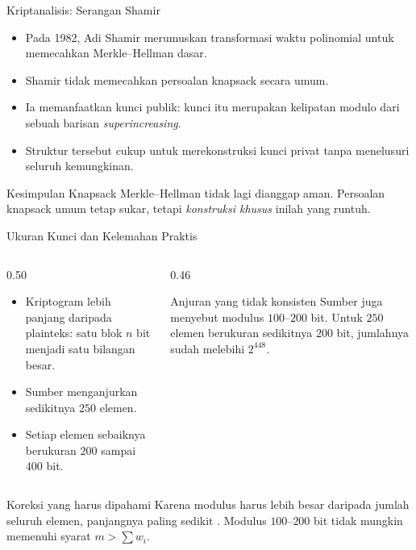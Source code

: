 \documentclass[aspectratio=169,11pt]{beamer}
\begin{document}
\begin{frame}{Kriptanalisis: Serangan Shamir}
    \begin{itemize}
        \item Pada 1982, Adi Shamir merumuskan transformasi waktu polinomial
              untuk memecahkan Merkle--Hellman dasar.
        \item Shamir tidak memecahkan persoalan knapsack secara umum.
        \item Ia memanfaatkan  kunci publik: kunci itu
              merupakan kelipatan modulo dari sebuah barisan
              \textit{superincreasing}.
        \item Struktur tersebut cukup untuk merekonstruksi kunci privat tanpa
              menelusuri seluruh kemungkinan.
    \end{itemize}
    \vspace{0.2cm}
    \begin{alertblock}{Kesimpulan}
        \footnotesize
        Knapsack Merkle--Hellman tidak lagi dianggap aman. Persoalan knapsack
        umum tetap sukar, tetapi \emph{konstruksi khusus} inilah yang runtuh.
    \end{alertblock}
\end{frame}

\begin{frame}{Ukuran Kunci dan Kelemahan Praktis}
    \begin{columns}[T,onlytextwidth]
        \begin{column}{0.50\textwidth}
            \footnotesize
            \begin{itemize}
                \item Kriptogram lebih panjang daripada plainteks: satu blok
                      $n$ bit menjadi satu bilangan besar.
                \item Sumber menganjurkan sedikitnya $250$ elemen.
                \item Setiap elemen sebaiknya berukuran $200$ sampai $400$
                      bit.
            \end{itemize}
        \end{column}
        \begin{column}{0.46\textwidth}
            \begin{alertblock}{Anjuran yang tidak konsisten}
                \footnotesize
                Sumber juga menyebut modulus $100$--$200$ bit. Untuk $250$
                elemen berukuran sedikitnya $200$ bit, jumlahnya sudah melebihi
                $2^{448}$.
            \end{alertblock}
        \end{column}
    \end{columns}
    \vspace{0.15cm}
    \begin{block}{Koreksi yang harus dipahami}
        \footnotesize
        Karena modulus harus lebih besar daripada jumlah seluruh elemen,
        panjangnya paling sedikit . Modulus $100$--$200$ bit
        tidak mungkin memenuhi syarat $m > \sum w_i$.
    \end{block}
\end{frame}
\end{document}
